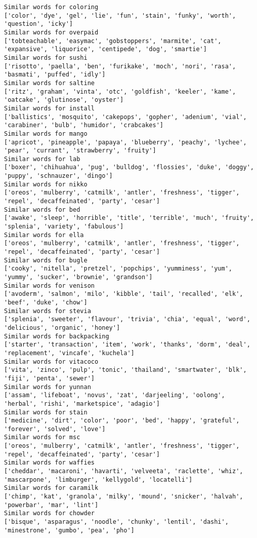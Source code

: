 \documentclass[11pt]{article}
\begin{document}
\begin{Verbatim}[commandchars=\\\{\}]
Similar words for coloring
['color', 'dye', 'gel', 'lie', 'fun', 'stain', 'funky', 'worth', 'question', 'icky']
Similar words for overpaid
['tobteachable', 'easymac', 'gobstoppers', 'marmite', 'cat', 'expansive', 'liquorice', 'centipede', 'dog', 'smartie']
Similar words for sushi
['risotto', 'paella', 'ben', 'furikake', 'moch', 'nori', 'rasa', 'basmati', 'puffed', 'idly']
Similar words for saltine
['ritz', 'graham', 'vinta', 'otc', 'goldfish', 'keeler', 'kame', 'oatcake', 'glutinose', 'oyster']
Similar words for install
['ballistics', 'mosquito', 'cakepops', 'gopher', 'adenium', 'vial', 'carabiner', 'bulb', 'humidor', 'crabcakes']
Similar words for mango
['apricot', 'pineapple', 'papaya', 'blueberry', 'peachy', 'lychee', 'pear', 'currant', 'strawberry', 'fruity']
Similar words for lab
['boxer', 'chihuahua', 'pug', 'bulldog', 'flossies', 'duke', 'doggy', 'puppy', 'schnauzer', 'dingo']
Similar words for nikko
['oreos', 'mulberry', 'catmilk', 'antler', 'freshness', 'tigger', 'repel', 'decaffeinated', 'party', 'cesar']
Similar words for bed
['awake', 'sleep', 'horrible', 'title', 'terrible', 'much', 'fruity', 'splenia', 'variety', 'fabulous']
Similar words for ella
['oreos', 'mulberry', 'catmilk', 'antler', 'freshness', 'tigger', 'repel', 'decaffeinated', 'party', 'cesar']
Similar words for bugle
['cooky', 'nitella', 'pretzel', 'popchips', 'yumminess', 'yum', 'yummy', 'sucker', 'brownie', 'grandson']
Similar words for venison
['avoderm', 'salmon', 'milo', 'kibble', 'tail', 'recalled', 'elk', 'beef', 'duke', 'chow']
Similar words for stevia
['splenia', 'sweeter', 'flavour', 'trivia', 'chia', 'equal', 'word', 'delicious', 'organic', 'honey']
Similar words for backpacking
['starter', 'transaction', 'item', 'work', 'thanks', 'dorm', 'deal', 'replacement', 'vincafe', 'kuchela']
Similar words for vitacoco
['vita', 'zinco', 'pulp', 'tonic', 'thailand', 'smartwater', 'blk', 'fiji', 'penta', 'sewer']
Similar words for yunnan
['assam', 'lifeboat', 'novus', 'zat', 'darjeeling', 'oolong', 'herbal', 'rishi', 'marketspice', 'adagio']
Similar words for stain
['medicine', 'dirt', 'color', 'poor', 'bed', 'happy', 'grateful', 'forever', 'solved', 'love']
Similar words for msc
['oreos', 'mulberry', 'catmilk', 'antler', 'freshness', 'tigger', 'repel', 'decaffeinated', 'party', 'cesar']
Similar words for waffies
['cheddar', 'macaroni', 'havarti', 'velveeta', 'raclette', 'whiz', 'mascarpone', 'limburger', 'kellygold', 'locatelli']
Similar words for caramilk
['chimp', 'kat', 'granola', 'milky', 'mound', 'snicker', 'halvah', 'powerbar', 'mar', 'lint']
Similar words for chowder
['bisque', 'asparagus', 'noodle', 'chunky', 'lentil', 'dashi', 'minestrone', 'gumbo', 'pea', 'pho']

\end{Verbatim}
\end{document}
